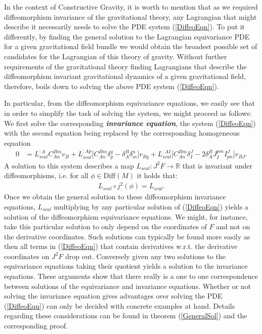\documentclass[a4paper,12pt, DIV=14, BCOR=5mm, twoside, headsepline, numbers=noenddot]{scrbook}
\begin{document}
In the context of Constructive Gravity, it is worth to mention that as we required diffeomorphism invariance of the gravitational theory, any Lagrangian that might describe it necessarily needs to solve the PDE system (\ref{DiffeoEqn}). To put it differently, by finding the general solution to the Lagrangian equivariance PDE for a given gravitational field bundle we would obtain the broadest possible set of candidates for the Lagrangian of this theory of gravity. Without further requirements of the gravitational theory finding Lagrangians that describe the diffeomorphism invariant gravitational dynamics of a given gravitational field, therefore, boils down to solving the above PDE system (\ref{DiffeoEqn}). 

In particular, from the diffeomorphism equivariance equations, we easily see that in order to simplify the task of solving the system, we might proceed as follows:
We first solve the corresponding \textit{\textbf{invariance equation}}, the system (\ref{DiffeoEqn}) with the second equation being replaced by the corresponding homogeneous equation
\begin{align}
    0 &= L_{scal}^{:A} C_{An}^{Bm} v_B + L_{scal}^{:Ap} \bigl[ C_{An}^{Bm} \delta_p^q - \delta_A^B \delta_m^n \bigr] v_{Bq} + L_{scal}^{:AI} \bigl[ C_{An}^{Bm} \delta_I^J - 2 \delta_A^B J_I^{pm} I^J_{pn}  \bigr] v_{BJ}.
\end{align}
A solution to this system describes a map $L_{scal}: J^2F \rightarrow \mathbb{R}$ that is invariant under diffeomorphisms, i.e. for all $\phi \in \mathrm{Diff}(M)$ it holds that:
\begin{align}
    L_{scal} \circ j^2(\phi) = L_{scal}.
\end{align}
Once we obtain the general solution to these diffeomorphism invariance equations, $L_{scal}$ multiplying by any particular solution of (\ref{DiffeoEqn}) yields a solution of the diffeomorphism equivariance equations. We might, for instance, take this particular solution to only depend on the coordinates of $F$ and not on the derivative coordinates. Such solutions can typically be found more easily as then all terms in (\ref{DiffeoEqn}) that contain derivatives w.r.t. the derivative coordinates on $J^2F$ drop out. Conversely given any two solutions to the equivariance equations taking their quotient yields a solution to the invariance equations. These arguments show that there really is a one to one correspondence between solutions of the equivariance and invariance equations. Whether or not solving the invariance equation gives advantages over solving the PDE (\ref{DiffeoEqn}) can only be decided with concrete examples at hand. Details regarding these considerations can be found in theorem (\ref{GeneralSol}) and the corresponding proof. 
\end{document}
